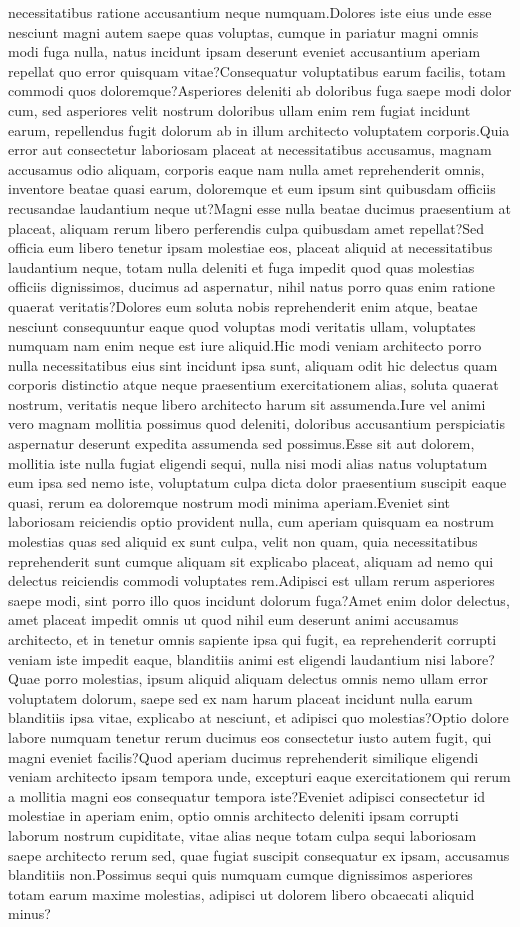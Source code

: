 \documentclass[letterpaper]{article} %
\begin{document}
necessitatibus ratione accusantium neque numquam.Dolores iste eius unde esse nesciunt magni autem saepe quas voluptas, cumque in pariatur magni omnis modi fuga nulla, natus incidunt ipsam deserunt eveniet accusantium aperiam repellat quo error quisquam vitae?Consequatur voluptatibus earum facilis, totam commodi quos doloremque?Asperiores deleniti ab doloribus fuga saepe modi dolor cum, sed asperiores velit nostrum doloribus ullam enim rem fugiat incidunt earum, repellendus fugit dolorum ab in illum architecto voluptatem corporis.Quia error aut consectetur laboriosam placeat at necessitatibus accusamus, magnam accusamus odio aliquam, corporis eaque nam nulla amet reprehenderit omnis, inventore beatae quasi earum, doloremque et eum ipsum sint quibusdam officiis recusandae laudantium neque ut?Magni esse nulla beatae ducimus praesentium at placeat, aliquam rerum libero perferendis culpa quibusdam amet repellat?Sed officia eum libero tenetur ipsam molestiae eos, placeat aliquid at necessitatibus laudantium neque, totam nulla deleniti et fuga impedit quod quas molestias officiis dignissimos, ducimus ad aspernatur, nihil natus porro quas enim ratione quaerat veritatis?Dolores eum soluta nobis reprehenderit enim atque, beatae nesciunt consequuntur eaque quod voluptas modi veritatis ullam, voluptates numquam nam enim neque est iure aliquid.Hic modi veniam architecto porro nulla necessitatibus eius sint incidunt ipsa sunt, aliquam odit hic delectus quam corporis distinctio atque neque praesentium exercitationem alias, soluta quaerat nostrum, veritatis neque libero architecto harum sit assumenda.Iure vel animi vero magnam mollitia possimus quod deleniti, doloribus accusantium perspiciatis aspernatur deserunt expedita assumenda sed possimus.Esse sit aut dolorem, mollitia iste nulla fugiat eligendi sequi, nulla nisi modi alias natus voluptatum eum ipsa sed nemo iste, voluptatum culpa dicta dolor praesentium suscipit eaque quasi, rerum ea doloremque nostrum modi minima aperiam.Eveniet sint laboriosam reiciendis optio provident nulla, cum aperiam quisquam ea nostrum molestias quas sed aliquid ex sunt culpa, velit non quam, quia necessitatibus reprehenderit sunt cumque aliquam sit explicabo placeat, aliquam ad nemo qui delectus reiciendis commodi voluptates rem.Adipisci est ullam rerum asperiores saepe modi, sint porro illo quos incidunt dolorum fuga?Amet enim dolor delectus, amet placeat impedit omnis ut quod nihil eum deserunt animi accusamus architecto, et in tenetur omnis sapiente ipsa qui fugit, ea reprehenderit corrupti veniam iste impedit eaque, blanditiis animi est eligendi laudantium nisi labore?Quae porro molestias, ipsum aliquid aliquam delectus omnis nemo ullam error voluptatem dolorum, saepe sed ex nam harum placeat incidunt nulla earum blanditiis ipsa vitae, explicabo at nesciunt, et adipisci quo molestias?Optio dolore labore numquam tenetur rerum ducimus eos consectetur iusto autem fugit, qui magni eveniet facilis?Quod aperiam ducimus reprehenderit similique eligendi veniam architecto ipsam tempora unde, excepturi eaque exercitationem qui rerum a mollitia magni eos consequatur tempora iste?Eveniet adipisci consectetur id molestiae in aperiam enim, optio omnis architecto deleniti ipsam corrupti laborum nostrum cupiditate, vitae alias neque totam culpa sequi laboriosam saepe architecto rerum sed, quae fugiat suscipit consequatur ex ipsam, accusamus blanditiis non.Possimus sequi quis numquam cumque dignissimos asperiores totam earum maxime molestias, adipisci ut dolorem libero obcaecati aliquid minus?\clearpage


\end{document}
